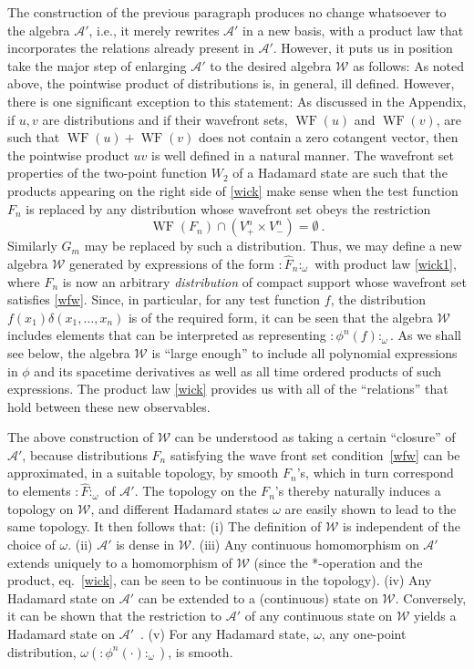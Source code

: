 \documentclass[12pt]{article}
\newcommand{\eA}{\mathscr{A}}
\newcommand{\eW}{\mathscr{W}}
\DeclareMathOperator{\WF}{WF}
\theoremstyle{plain}
\theoremstyle{definition}
\def\ben{\begin{equation}}
\def\een{\end{equation}}
\begin{document}
The construction of the previous paragraph produces no change whatsoever to the algebra $\eA'$, i.e., it merely rewrites
$\eA'$ in a new basis, with a product law that incorporates the relations already present in $\eA'$.
However, it puts us in position take the major step of enlarging
$\eA'$ to the desired algebra $\eW$ as follows: As noted above, the pointwise product of distributions is, in general, ill defined. However,
there is one significant exception to this statement: As discussed in the Appendix, if $u,v$ are distributions and if their wavefront sets,
$\WF(u)$ and $\WF(v)$, are such that $\WF(u) + \WF(v)$ does not contain a zero cotangent vector, then the pointwise product
$uv$ is well defined in a natural manner. The wavefront set properties of the two-point function $W_{2}$ of a Hadamard state
are such that the products appearing on the right side of \eqref{wick} make sense when the test function $F_n$  is replaced by any
distribution whose wavefront set obeys the restriction
\ben
\WF(F_n) \cap (V_+^n \times V_-^n) = \emptyset \ .
\label{wfw}
\een
Similarly $G_m$ may be replaced by such a distribution.
Thus, we may define a new algebra $\eW$ generated by expressions of the form $:\hat{F}_n:_{\omega}$ with product
law \eqref{wick1}, where $F_n$ is now an arbitrary {\em distribution} of compact support whose wavefront set satisfies
\eqref{wfw}. Since, in particular, for any test function $f$, the distribution $f(x_1) \delta(x_1, \dots, x_n)$ is of the required form, it can be seen that the algebra
$\eW$ includes elements that can be interpreted as representing $:\phi^n(f):_{\omega}$. As we shall see below, the algebra $\eW$ is ``large enough'' to include all polynomial expressions in $\phi$ and its spacetime derivatives as well as all time
ordered products of such expressions. The product law \eqref{wick} provides us with all of the ``relations'' that hold between
these new observables.

The above construction of $\eW$ can be understood as taking a certain ``closure'' of $\eA'$, because distributions $F_n$ satisfying the
wave front set condition~\eqref{wfw} can be approximated, in a suitable topology, by smooth $F_n$'s, which in turn correspond
to elements $: \hat F :_{\omega}$ of $\eA'$. The topology on the $F_n$'s thereby naturally induces a topology on $\eW$, and different
Hadamard states $\omega$ are easily shown to lead to the same topology. It then follows that: (i) The definition of $\eW$ is
independent of the choice of $\omega$. (ii) $\eA'$ is dense in $\eW$. (iii) Any continuous homomorphism on $\eA'$ extends
uniquely to a homomorphism of $\eW$ (since the *-operation and the product,
eq.~\eqref{wick}, can be seen to be continuous in the topology). (iv) Any Hadamard state on $\eA'$ can be extended to a (continuous) state
on $\eW$. Conversely, it can be shown that the restriction to $\eA'$ of any continuous state on $\eW$ yields a Hadamard state on $\eA'$~\cite{sanders2,hollandsruan}. (v) For any Hadamard state, $\omega$, any one-point distribution, $\omega(:\phi^n(\cdot):_\omega)$, is smooth.
\end{document}
